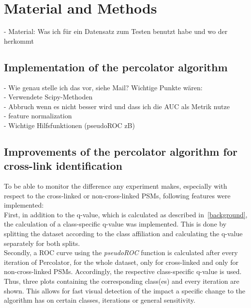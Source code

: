 
\chapter{Material and Methods}
\label{matmet}

- Material: Was ich für ein Datensatz zum Testen benutzt habe und wo der herkommt

\section{Implementation of the percolator algorithm}
- Wie genau stelle ich das vor, siehe Mail? Wichtige Punkte wären:\\
- Verwendete Scipy-Methoden\\
- Abbruch wenn es nicht besser wird und dass ich die AUC als Metrik nutze\\
- feature normalization\\
- Wichtige Hilfsfunktionen (pseudoROC zB)

\section{Improvements of the percolator algorithm for cross-link identification}
To be able to monitor the difference any experiment makes, especially with respect to the cross-linked or non-cross-linked PSMs, following features were implemented:\\
First, in addition to the q-value, which is calculated as described in~\ref{background}, the calculation of a class-specific q-value was implemented. This is done by splitting the dataset according to the class affiliation and calculating the q-value separately for both splits.\\
Secondly, a ROC curve using the \emph{pseudoROC} function is calculated after every iteration of Percolator, for the whole dataset, only for cross-linked and only for non-cross-linked PSMs. Accordingly, the respective class-specific q-value is used. Thus, three plots containing the corresponding class(es) and every iteration are shown. This allows for fast visual detection of the impact a specific change to the algorithm has on certain classes, iterations or general sensitivity.
